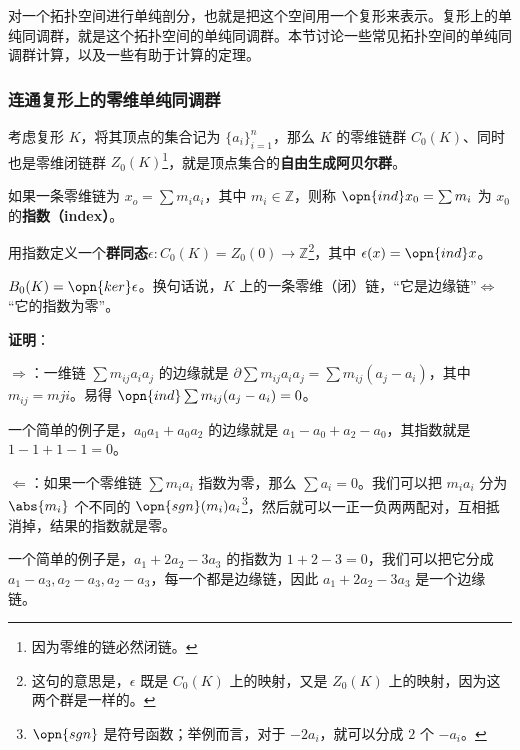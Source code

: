 



对一个拓扑空间进行单纯剖分，也就是把这个空间用一个复形来表示。复形上的单纯同调群，就是这个拓扑空间的单纯同调群。本节讨论一些常见拓扑空间的单纯同调群计算，以及一些有助于计算的定理。

\subsubsection{连通复形上的零维单纯同调群}

考虑复形 $K$，将其顶点的集合记为 $\{a_i\}_{i=1}^n$，那么 $K$ 的零维链群 $C_0(K)$、同时也是零维闭链群 $Z_0(K)$\footnote{因为零维的链必然闭链。}，就是顶点集合的\textbf{自由生成阿贝尔群}。

如果一条零维链为 $x_o=\sum m_ia_i$，其中 $m_i\in\mathbb{Z}$，则称 $\opn{ind} x_0=\sum m_i$ 为 $x_0$ 的\textbf{指数（index）}。

用指数定义一个\textbf{群同态}$\epsilon: C_0(K)=Z_0(0)\to\mathbb{Z}$\footnote{这句的意思是，$\epsilon$ 既是 $C_0(K)$ 上的映射，又是 $Z_0(K)$ 上的映射，因为这两个群是一样的。}，其中 $\epsilon(x)=\opn{ind} x$。

\begin{lemma}{}\label{SHCal_lem1}
$B_0(K)=\opn{ker}\epsilon$。换句话说，$K$ 上的一条零维（闭）链，“它是边缘链”$\iff$“它的指数为零”。
\end{lemma}

\textbf{证明}：

$\Rightarrow$：一维链 $\sum m_{ij}a_ia_j$ 的边缘就是 $\partial\sum m_{ij}a_ia_j=\sum m_{ij}(a_j-a_i)$，其中 $m_{ij}=m{ji}$。易得 $\opn{ind}\sum m_{ij}(a_j-a_i)=0$。

一个简单的例子是，$a_0a_1+a_0a_2$ 的边缘就是 $a_1-a_0+a_2-a_0$，其指数就是 $1-1+1-1=0$。


$\Leftarrow$：如果一个零维链 $\sum m_ia_i$ 指数为零，那么 $\sum a_i=0$。我们可以把 $m_ia_i$ 分为 $\abs{m_i}$ 个不同的 $\opn{sgn}(m_i)a_i$\footnote{$\opn{sgn}$ 是符号函数；举例而言，对于 $-2a_i$，就可以分成 $2$ 个 $-a_i$。}，然后就可以一正一负两两配对，互相抵消掉，结果的指数就是零。

一个简单的例子是，$a_1+2a_2-3a_3$ 的指数为 $1+2-3=0$，我们可以把它分成 $a_1-a_3, a_2-a_3, a_2-a_3$，每一个都是边缘链，因此 $a_1+2a_2-3a_3$ 是一个边缘链。

